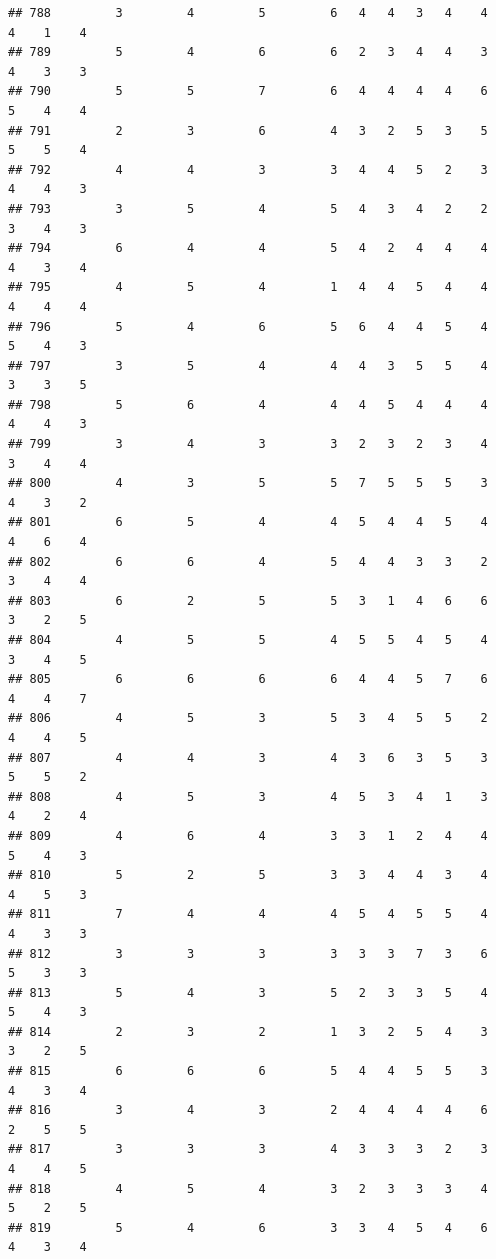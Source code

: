 \documentclass[
]{article}
\begin{document}
\begin{verbatim}
## 788         3         4         5         6   4   4   3   4    4    4    1    4
## 789         5         4         6         6   2   3   4   4    3    4    3    3
## 790         5         5         7         6   4   4   4   4    6    5    4    4
## 791         2         3         6         4   3   2   5   3    5    5    5    4
## 792         4         4         3         3   4   4   5   2    3    4    4    3
## 793         3         5         4         5   4   3   4   2    2    3    4    3
## 794         6         4         4         5   4   2   4   4    4    4    3    4
## 795         4         5         4         1   4   4   5   4    4    4    4    4
## 796         5         4         6         5   6   4   4   5    4    5    4    3
## 797         3         5         4         4   4   3   5   5    4    3    3    5
## 798         5         6         4         4   4   5   4   4    4    4    4    3
## 799         3         4         3         3   2   3   2   3    4    3    4    4
## 800         4         3         5         5   7   5   5   5    3    4    3    2
## 801         6         5         4         4   5   4   4   5    4    4    6    4
## 802         6         6         4         5   4   4   3   3    2    3    4    4
## 803         6         2         5         5   3   1   4   6    6    3    2    5
## 804         4         5         5         4   5   5   4   5    4    3    4    5
## 805         6         6         6         6   4   4   5   7    6    4    4    7
## 806         4         5         3         5   3   4   5   5    2    4    4    5
## 807         4         4         3         4   3   6   3   5    3    5    5    2
## 808         4         5         3         4   5   3   4   1    3    4    2    4
## 809         4         6         4         3   3   1   2   4    4    5    4    3
## 810         5         2         5         3   3   4   4   3    4    4    5    3
## 811         7         4         4         4   5   4   5   5    4    4    3    3
## 812         3         3         3         3   3   3   7   3    6    5    3    3
## 813         5         4         3         5   2   3   3   5    4    5    4    3
## 814         2         3         2         1   3   2   5   4    3    3    2    5
## 815         6         6         6         5   4   4   5   5    3    4    3    4
## 816         3         4         3         2   4   4   4   4    6    2    5    5
## 817         3         3         3         4   3   3   3   2    3    4    4    5
## 818         4         5         4         3   2   3   3   3    4    5    2    5
## 819         5         4         6         3   3   4   5   4    6    4    3    4

\end{verbatim}
\end{document}

